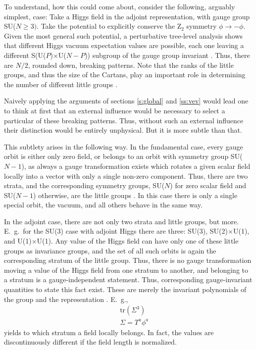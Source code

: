 \documentclass[final,12pt,3p,longtitle]{elsarticle}
\newcommand*{\no}{\noindent}
\newcommand*{\bea}{\begin{eqnarray}}
\newcommand*{\eea}{\end{eqnarray}}
\newcommand*{\nn}{\nonumber}
\newcommand*{\tr}{\mathrm{tr}}
\newcommand*{\1}{1\!\!\!\bot}
\begin{document}
To understand, how this could come about, consider the following, arguably simplest, case: Take a Higgs field in the adjoint representation, with gauge group SU($N\ge 3)$. Take the potential to explicitly conserve the Z$_2$ symmetry $\phi\to-\phi$. Given the most general such potential, a perturbative tree-level analysis shows that different Higgs vacuum expectation values are possible, each one leaving a different S(U($P$)$\times$U($N-P$)) subgroup of the gauge group invariant \cite{Li:1973mq,Ruegg:1980gf,Murphy:1983rf,Maas:2017xzh}. Thus, there are $N/2$, rounded down, breaking patterns. Note that the ranks of the little groups, and thus the size of the Cartans, play an important role in determining the number of different little groups \cite{O'Raifeartaigh:1986vq}.

Naively applying the arguments of sections \ref{s:global} and \ref{ss:vev} would lead one to think at first that an external influence would be necessary to select a particular of these breaking patterns. Thus, without such an external influence their distinction would be entirely unphysical. But it is more subtle than that.

This subtlety arises in the following way. In the fundamental case, every gauge orbit is either only zero field, or belongs to an orbit with symmetry group SU($N-1$), as always a gauge transformation exists which rotates a given scalar field locally into a vector with only a single non-zero component. Thus, there are two strata, and the corresponding symmetry groups, SU($N$) for zero scalar field and SU($N-1$) otherwise, are the little groups \cite{O'Raifeartaigh:1986vq}. In this case there is only a single special orbit, the vacuum, and all others behave in the same way.

In the adjoint case, there are not only two strata and little groups, but more. E.\ g.\ for the SU(3) case with adjoint Higgs there are three: SU(3), SU(2)$\times$U(1), and U(1)$\times$U(1). Any value of the Higgs field can have only one of these little groups as invariance groups, and the set of all such orbits is again the corresponding stratum of the little group. Thus, there is no gauge transformation moving a value of the Higgs field from one stratum to another, and belonging to a stratum is a gauge-independent statement. Thus, corresponding gauge-invariant quantities to state this fact exist. These are merely the invariant polynomials of the group and the representation \cite{O'Raifeartaigh:1986vq}. E.\ g., 
\bea
&&\tr\left(\Sigma^{3}\right)\label{eq:sigma3}\\
&&\Sigma=T^a\phi^a\nn
\eea
\no yields to which stratum a field locally belongs. In fact, the values are discontinuously different if the field length is normalized.
\end{document}

